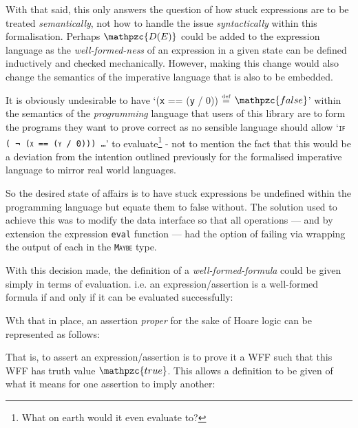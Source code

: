 \documentclass[oneside,12pt]{article}
\newcommand{\impcode}[1]{\textsc{\texttt{#1}}}
\newcommand{\textM}[1]{\ensuremath{\mathpzc{#1}}}
\newcommand{\eqdef}{$\stackrel{\text{\tiny def}}{=}$}
\begin{document}
With that said, this only answers the question of how stuck expressions are to be treated \emph{semantically}, not how to handle the issue \emph{syntactically} within this formalisation. Perhaps \textM{D(E)} could be added to the expression language as the \emph{well-formed-ness} of an expression in a given state can be defined inductively and checked mechanically. However, making this change would also change the semantics of the imperative language that is also to be embedded.


It is obviously undesirable to have `(\texttt{x} == (\texttt{y} / 0)) \eqdef \; \textM{false}' within the semantics of the \emph{programming} language that users of this library are to form the programs they want to prove correct as no sensible language should allow \mbox{`\impcode{if ( ¬ (\texttt{x} == (\texttt{y} / 0))) \ldots}'} to evaluate\footnote{What on earth would it even evaluate to?}  - not to mention the fact that this would be a deviation from the intention outlined previously for the formalised imperative language to mirror real world languages.


So the desired state of affairs is to have stuck expressions be undefined within the programming language but equate them to false without.  The solution used to achieve this was to modify the data interface so that all operations --- and by extension the expression \texttt{eval} function --- had the option of failing via wrapping the output of each in the \impcode{Maybe} type. 


With this decision made, the definition of a \emph{well-formed-formula} could be given simply in terms of evaluation. i.e.\!\! an expression/assertion is a well-formed formula if and only if it can be evaluated successfully:

{\advance\leftskip\mathindent
  \advance\leftskip\mathindent
  


}

Wth that in place, an assertion \emph{proper} for the sake of Hoare logic can be represented as follows:


{\advance\leftskip\mathindent
  \advance\leftskip\mathindent



}

\vspace{-1.5em}

That is, to assert an expression/assertion is to prove it a WFF such that this WFF has truth value \textM{true}. This allows a definition to be given of what it means for one assertion to imply another:
\end{document}
